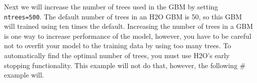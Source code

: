 \documentclass[]{book}
\newenvironment{Shaded}{\begin{snugshade}}{\end{snugshade}}
\newcommand{\CommentTok}[1]{\textcolor[rgb]{0.56,0.35,0.01}{\textit{#1}}}
\newcommand{\DataTypeTok}[1]{\textcolor[rgb]{0.13,0.29,0.53}{#1}}
\newcommand{\DecValTok}[1]{\textcolor[rgb]{0.00,0.00,0.81}{#1}}
\newcommand{\ErrorTok}[1]{\textcolor[rgb]{0.64,0.00,0.00}{\textbf{#1}}}
\newcommand{\KeywordTok}[1]{\textcolor[rgb]{0.13,0.29,0.53}{\textbf{#1}}}
\newcommand{\NormalTok}[1]{#1}
\newcommand{\OperatorTok}[1]{\textcolor[rgb]{0.81,0.36,0.00}{\textbf{#1}}}
\newcommand{\StringTok}[1]{\textcolor[rgb]{0.31,0.60,0.02}{#1}}
\begin{document}
\begin{Shaded}
\end{Shaded}

Next we will increase the number of trees used in the GBM by setting \texttt{ntrees=500}.
The default number of trees in an H2O GBM is 50, so this GBM will trained using ten times
the default. Increasing the number of trees in a GBM is one way to increase performance
of the model, however, you have to be careful not to overfit your model to the training data
by using too many trees. To automatically find the optimal number of trees, you must use
H2O's early stopping functionality. This example will not do that, however, the following \# example will.
\end{document}

